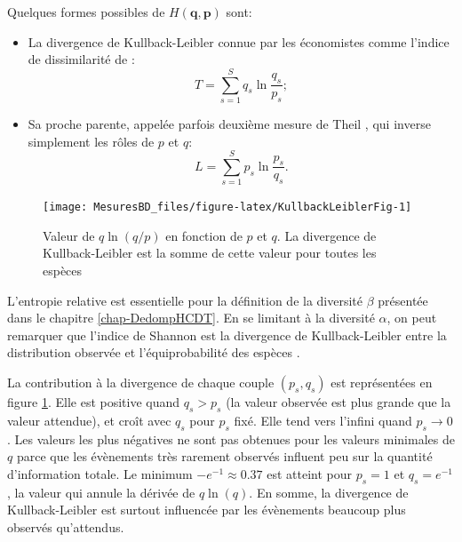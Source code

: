 \documentclass[
  11pt,
  american,
  a4paper,
  extrafontsizes,onecolumn,openright
  ]{memoir}
\providecommand{\tightlist}{%
  \setlength{\itemsep}{0pt}\setlength{\parskip}{0pt}}
\newlength{\rf}
\begin{document}
Quelques formes possibles de \(H(\mathbf{q}, \mathbf{p})\) sont:

\begin{itemize}
\tightlist
\item
  La divergence de Kullback-Leibler \autocite{Kullback1951} connue par les économistes comme l'indice de dissimilarité de \textcite{Theil1967}:
  \begin{equation}
  \label{eq:Theil}
  T = \sum^S_{s=1}{q_{s}\ln\frac{q_s}{p_s}};
  \end{equation}
\item
  Sa proche parente, appelée parfois deuxième mesure de Theil \autocite{Conceicao2000}, qui inverse simplement les rôles de \(p\) et \(q\):
  \begin{equation}
  \label{eq:Theil2}
  L = \sum^S_{s=1}{p_{s}\ln\frac{p_s}{q_s}}.
  \end{equation}
\end{itemize}



\scriptsize

\begin{figure}

{\centering \texttt{[image: MesuresBD\_files/figure-latex/KullbackLeiblerFig-1]} 

}

\caption{Valeur de \(q \ln(q / p)\) en fonction de \(p\) et \(q\). La divergence de Kullback-Leibler est la somme de cette valeur pour toutes les espèces}\label{fig:KullbackLeiblerFig}
\end{figure}

\normalsize

L'entropie relative est essentielle pour la définition de la diversité \(\beta\) présentée dans le chapitre \ref{chap-DedompHCDT}.
En se limitant à la diversité \(\alpha\), on peut remarquer que l'indice de Shannon est la divergence de Kullback-Leibler entre la distribution observée et l'équiprobabilité des espèces \autocite{Marcon2012a}.

La contribution à la divergence de chaque couple \((p_s, q_s)\) est représentées en figure \ref{fig:KullbackLeiblerFig}.
Elle est positive quand \(q_s > p_s\) (la valeur observée est plus grande que la valeur attendue), et croît avec \(q_s\) pour \(p_s\) fixé.
Elle tend vers l'infini quand \(p_s \to 0\).
Les valeurs les plus négatives ne sont pas obtenues pour les valeurs minimales de \(q\) parce que les évènements très rarement observés influent peu sur la quantité d'information totale.
Le minimum \(-e^{-1} \approx 0.37\) est atteint pour \(p_s = 1\) et \(q_s = e^{-1}\), la valeur qui annule la dérivée de \(q \ln(q)\).
En somme, la divergence de Kullback-Leibler est surtout influencée par les évènements beaucoup plus observés qu'attendus.
\end{document}
